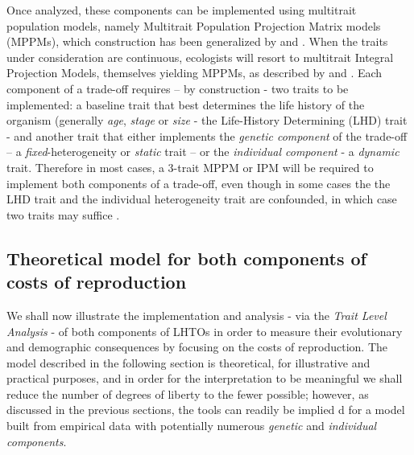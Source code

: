 \documentclass[10pt,a4paper]{article}
\begin{document}
Once analyzed, these components %
can be implemented using multitrait population models, namely Multitrait Population Projection Matrix models (MPPMs), which construction has been  generalized  by \citet{Coste2017} and \citet{Roth2016}. 
When the traits under consideration are continuous, ecologists will resort to multitrait Integral Projection Models, themselves yielding MPPMs, as described by \citet{Ellner2006} and \citet{Vindenes2015}.  Each component of a trade-off requires – by construction - two traits to be implemented: a baseline trait that best determines the life history of the organism  (generally \emph{age}, \emph{stage} or \emph{size} - the Life-History Determining (LHD) trait -  and another trait that either implements the \emph{genetic component} of the trade-off – a \emph{fixed}-heterogeneity or \emph{static} trait  – or the \emph{individual component}  - a \emph{dynamic} trait. 
Therefore in most cases, a 3-trait MPPM or IPM  will be required to implement both components of a trade-off, even though in some cases the the LHD trait  and  the individual heterogeneity trait are confounded, in which case two traits may suffice \citep{Vindenes2015}.

\subsection{Theoretical model for both components of costs of reproduction}
We shall now illustrate the implementation and analysis - via the \emph{Trait Level Analysis} - of both components of LHTOs in order to measure their evolutionary and demographic consequences by focusing on the costs of reproduction.  The model described in the following section is theoretical, for illustrative and practical purposes, and in order for the interpretation to be meaningful we shall reduce the number of degrees of liberty to the fewer possible; however, as discussed in the previous sections, the tools can readily be implied d for a model built from empirical data with potentially numerous \emph{genetic} and \emph{individual components}.\\
\end{document}
